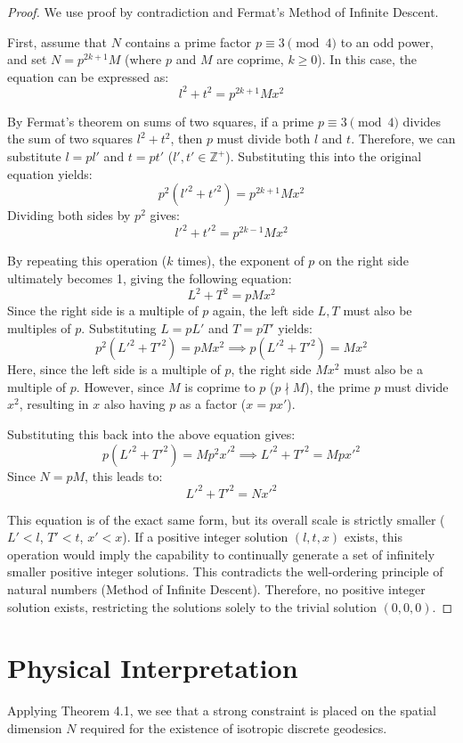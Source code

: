 \documentclass[11pt,a4paper]{article}
\begin{document}
\begin{proof}
We use proof by contradiction and Fermat's Method of Infinite Descent.

First, assume that \( N \) contains a prime factor \( p \equiv 3 \pmod 4 \) to an odd power, and set \( N = p^{2k+1}M \) (where \( p \) and \( M \) are coprime, \( k \ge 0 \)). In this case, the equation can be expressed as:
\[ l^2 + t^2 = p^{2k+1} M x^2 \]

By Fermat's theorem on sums of two squares, if a prime \( p \equiv 3 \pmod 4 \) divides the sum of two squares \( l^2 + t^2 \), then \( p \) must divide both \( l \) and \( t \).
Therefore, we can substitute \( l = p l' \) and \( t = p t' \) (\( l', t' \in \mathbb{Z}^+ \)). Substituting this into the original equation yields:
\[ p^2(l'^2 + t'^2) = p^{2k+1} M x^2 \]
Dividing both sides by \( p^2 \) gives:
\[ l'^2 + t'^2 = p^{2k-1} M x^2 \]

By repeating this operation (\( k \) times), the exponent of \( p \) on the right side ultimately becomes 1, giving the following equation:
\[ L^2 + T^2 = p M x^2 \]
Since the right side is a multiple of \( p \) again, the left side \( L, T \) must also be multiples of \( p \). Substituting \( L = p L' \) and \( T = p T' \) yields:
\[ p^2(L'^2 + T'^2) = p M x^2 \implies p(L'^2 + T'^2) = M x^2 \]
Here, since the left side is a multiple of \( p \), the right side \( M x^2 \) must also be a multiple of \( p \). However, since \( M \) is coprime to \( p \) (\( p \nmid M \)), the prime \( p \) must divide \( x^2 \), resulting in \( x \) also having \( p \) as a factor (\( x = p x' \)).

Substituting this back into the above equation gives:
\[ p(L'^2 + T'^2) = M p^2 x'^2 \implies L'^2 + T'^2 = M p x'^2 \]
Since \( N = p M \), this leads to:
\[ L'^2 + T'^2 = N x'^2 \]

This equation is of the exact same form, but its overall scale is strictly smaller (\( L' < l \), \( T' < t \), \( x' < x \)).
If a positive integer solution \( (l, t, x) \) exists, this operation would imply the capability to continually generate a set of infinitely smaller positive integer solutions. This contradicts the well-ordering principle of natural numbers (Method of Infinite Descent).
Therefore, no positive integer solution exists, restricting the solutions solely to the trivial solution \( (0, 0, 0) \).
\end{proof}

\section{Physical Interpretation}
Applying Theorem 4.1, we see that a strong constraint is placed on the spatial dimension \( N \) required for the existence of isotropic discrete geodesics.
\end{document}
